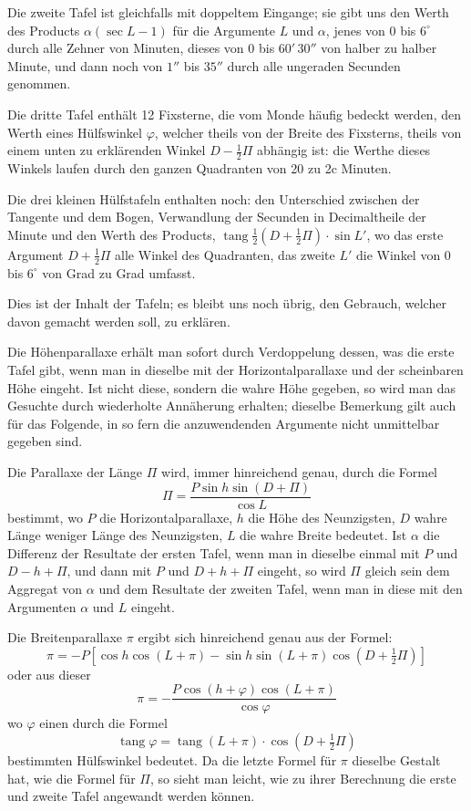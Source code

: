 Die zweite Tafel ist gleichfalls mit doppeltem Eingange; sie gibt uns den Werth des Products
$\alpha(\sec L - 1)$ für die Argumente $L$ und $\alpha$, jenes von 0 bis $6^{\circ}$ durch alle Zehner von Minuten, dieses von
0 bis $60'\,30''$ von halber zu halber Minute, und dann noch von $1''$ bis $35''$ durch alle ungeraden Secunden
genommen.

Die dritte Tafel enthält 12 Fixsterne, die vom Monde häufig bedeckt werden, den Werth eines
Hülfswinkel $\varphi$, welcher theils von der Breite des Fixsterns, theils von einem unten zu erklärenden
Winkel $D - \tfrac{1}{2}\Pi$ abhängig ist: die Werthe dieses Winkels laufen durch den ganzen Quadranten von
20 zu 2c Minuten.

Die drei kleinen Hülfstafeln enthalten noch: den Unterschied zwischen der Tangente und dem
Bogen, Verwandlung der Secunden in Decimaltheile der Minute und den Werth des Products,
$\operatorname{tang} \tfrac{1}{2}(D+\tfrac{1}{2}\Pi)\cdot\sin L'$, wo das erste Argument $D+\tfrac{1}{2}\Pi$ alle Winkel des Quadranten, das zweite $L'$
die Winkel von 0 bis $6^{\circ}$ von Grad zu Grad umfasst.

Dies ist der Inhalt der Tafeln; es bleibt uns noch übrig, den Gebrauch, welcher davon gemacht
werden soll, zu erklären.

Die Höhenparallaxe erhält man sofort durch Verdoppelung dessen, was die erste Tafel gibt, wenn
man in dieselbe mit der Horizontalparallaxe und der scheinbaren Höhe eingeht. Ist nicht diese, sondern die wahre Höhe gegeben, so wird man das Gesuchte durch wiederholte Annäherung erhalten; dieselbe Bemerkung gilt auch für das Folgende, in so fern die anzuwendenden Argumente nicht unmittelbar gegeben sind.

Die Parallaxe der Länge $\Pi$ wird, immer hinreichend genau, durch die Formel
\[
\Pi = \dfrac{P \sin h \sin(D+\Pi)}{\cos L}
\]
bestimmt, wo $P$ die Horizontalparallaxe, $h$ die Höhe des Neunzigsten, $D$ wahre Länge weniger Länge
des Neunzigsten, $L$ die wahre Breite bedeutet. Ist $\alpha$ die Differenz der Resultate der ersten Tafel, wenn
man in dieselbe einmal mit $P$ und $D-h+\Pi$, und dann mit $P$ und $D+h+\Pi$ eingeht, so wird $\Pi$
gleich sein dem Aggregat von $\alpha$ und dem Resultate der zweiten Tafel, wenn man in diese mit den Argumenten $\alpha$ und $L$ eingeht.

Die Breitenparallaxe $\pi$ ergibt sich hinreichend genau aus der Formel:
\[
\pi = -P[\cos h \cos(L+\pi) - \sin h \sin(L+\pi)\cos(D+\tfrac{1}{2}\Pi)]
\]
oder aus dieser
\[
\pi = -\dfrac{P\cos(h+\varphi)\cos(L+\pi)}{\cos\varphi}
\]
wo $\varphi$ einen durch die Formel
\[
\operatorname{tang} \varphi = \operatorname{tang}(L+\pi)\cdot\cos(D+\tfrac{1}{2}\Pi)
\]
bestimmten Hülfswinkel bedeutet. Da die letzte Formel für $\pi$ dieselbe Gestalt hat, wie die Formel für
$\Pi$, so sieht man leicht, wie zu ihrer Berechnung die erste und zweite Tafel angewandt werden können.

